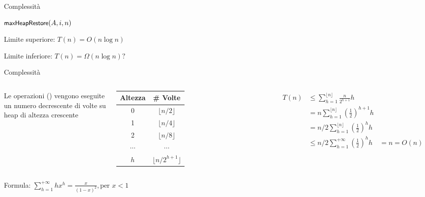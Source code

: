 \begin{frame}{Complessità}

\begin{Procedure}
\caption[A]{\heapbuild($\Item[\,]\ A$, \INTEGER $n$)}
\label{alg:heapbuild}

{
  $\textsf{{\small maxHeapRestore}}(A, i, n)$\;
}
\end{Procedure}

\pause
\BIL
\item Limite superiore: \pause $T(n) = O(n \log n)$
\item Limite inferiore: \pause $T(n) = \Omega(n \log n)?$
\EIL
\end{frame}
    
\begin{frame}{Complessità}
    
\vspace{-6pt}
\begin{columns}[T]
Le operazioni \maxheapify() vengono eseguite un numero
decrescente di volte su heap di altezza crescente

\medskip
\begin{tabular}{|c|c|}
\hline
\textbf{Altezza} & \textbf{\# Volte} \\\hline
0 & $\lfloor n/2\rfloor$ \\\hline
1 & $\lfloor n/4\rfloor$ \\\hline
2 & $\lfloor n/8\rfloor$ \\\hline
$\cdots$ & $\cdots$ \\\hline
$h$ & $\lfloor n/2^{h+1}\rfloor$ \\\hline
\end{tabular}
\begin{align*}
T(n) &\leq \sum_{h=1}^{\lfloor n \rfloor} \frac{n}{2^{h+1}}h \\
     &= n\sum_{h=1}^{\lfloor n \rfloor} \left(\frac{1}{2}\right)^{h+1}h \\
     &= n/2 \sum_{h=1}^{\lfloor n \rfloor} \left(\frac{1}{2}\right)^{h}h \\
     &\leq n/2 \sum_{h=1}^{+\infty} \left(\frac{1}{2}\right)^{h}h 
     & = n = O(n)\\
\end{align*}
\end{columns}

\vspace{-12pt}
Formula: $\displaystyle \sum_{h=1}^{+\infty} hx^h = \frac{x}{(1-x)^2}, \textrm{per $x<1$}$

\end{frame}


